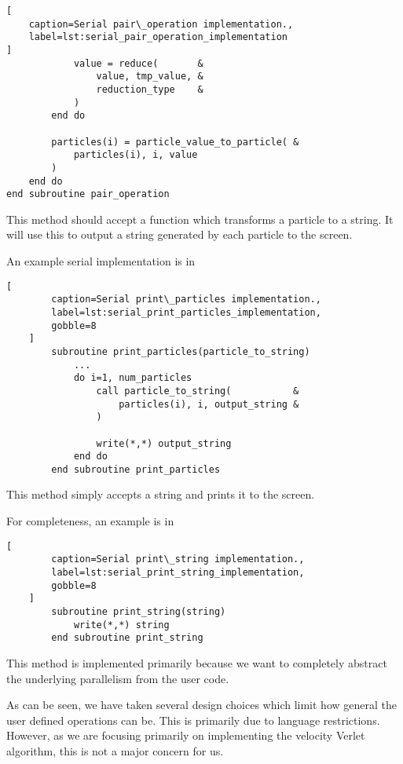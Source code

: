 \begin{description}[style=nextline]
\begin{lstlisting}[
    caption=Serial pair\_operation implementation.,
    label=lst:serial_pair_operation_implementation
]
            value = reduce(       &
                value, tmp_value, &
                reduction_type    & 
            )
        end do

        particles(i) = particle_value_to_particle( &
            particles(i), i, value
        )
    end do
end subroutine pair_operation
\end{lstlisting}

\item[print\_particles]
    This method should accept a function which transforms a particle
    to a string. It will use this to output a string generated by
    each particle to the screen.

    An example serial implementation is in

    \begin{lstlisting}[
        caption=Serial print\_particles implementation.,
        label=lst:serial_print_particles_implementation,
        gobble=8
    ]
        subroutine print_particles(particle_to_string)
            ...
            do i=1, num_particles
                call particle_to_string(           &
                    particles(i), i, output_string &
                )

                write(*,*) output_string
            end do
        end subroutine print_particles
    \end{lstlisting}

\item[print\_string]
    This method simply accepts a string and prints it to the screen.

    For completeness, an example is in

    \begin{lstlisting}[
        caption=Serial print\_string implementation.,
        label=lst:serial_print_string_implementation,
        gobble=8
    ]
        subroutine print_string(string)
            write(*,*) string
        end subroutine print_string
    \end{lstlisting}

    This method is implemented primarily because we want to completely
    abstract the underlying parallelism from the user code.
\end  {description}

As can be seen, we have taken several design choices which limit how
general the user defined operations can be.
%
This is primarily due to language restrictions.
%
However, as we are focusing primarily on implementing the velocity
Verlet algorithm, this is not a major concern for us.

